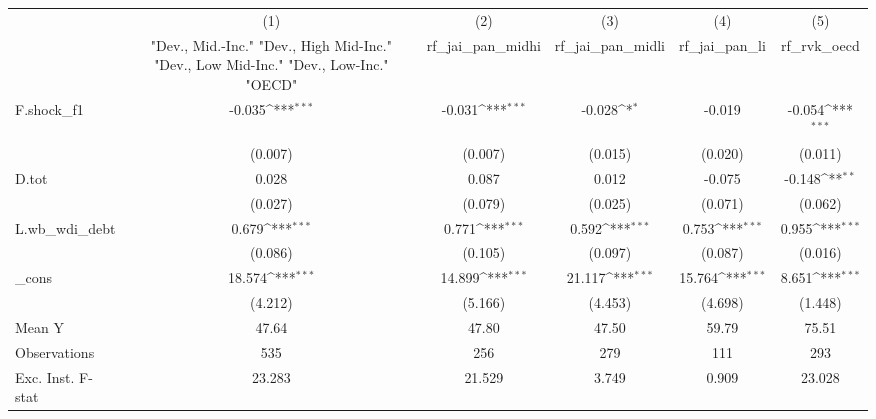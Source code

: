 {
\def\sym#1{\ifmmode^{#1}\else\(^{#1}\)\fi}
\begin{tabular}{l*{5}{c}}
\toprule
            &\multicolumn{1}{c}{(1)}&\multicolumn{1}{c}{(2)}&\multicolumn{1}{c}{(3)}&\multicolumn{1}{c}{(4)}&\multicolumn{1}{c}{(5)}\\
            &\multicolumn{1}{c}{ "Dev., Mid.-Inc." "Dev., High Mid-Inc." "Dev., Low Mid-Inc." "Dev., Low-Inc." "OECD" }&\multicolumn{1}{c}{rf\_jai\_pan\_midhi}&\multicolumn{1}{c}{rf\_jai\_pan\_midli}&\multicolumn{1}{c}{rf\_jai\_pan\_li}&\multicolumn{1}{c}{rf\_rvk\_oecd}\\
\midrule
F.shock\_f1  &      -0.035\sym{***}&      -0.031\sym{***}&      -0.028\sym{*}  &      -0.019         &      -0.054\sym{***}\\
            &     (0.007)         &     (0.007)         &     (0.015)         &     (0.020)         &     (0.011)         \\
\addlinespace
D.tot       &       0.028         &       0.087         &       0.012         &      -0.075         &      -0.148\sym{**} \\
            &     (0.027)         &     (0.079)         &     (0.025)         &     (0.071)         &     (0.062)         \\
\addlinespace
L.wb\_wdi\_debt&       0.679\sym{***}&       0.771\sym{***}&       0.592\sym{***}&       0.753\sym{***}&       0.955\sym{***}\\
            &     (0.086)         &     (0.105)         &     (0.097)         &     (0.087)         &     (0.016)         \\
\addlinespace
\_cons      &      18.574\sym{***}&      14.899\sym{***}&      21.117\sym{***}&      15.764\sym{***}&       8.651\sym{***}\\
            &     (4.212)         &     (5.166)         &     (4.453)         &     (4.698)         &     (1.448)         \\
\midrule
Mean Y      &       47.64         &       47.80         &       47.50         &       59.79         &       75.51         \\
Observations&         535         &         256         &         279         &         111         &         293         \\
Exc. Inst. F-stat&      23.283         &      21.529         &       3.749         &       0.909         &      23.028         \\
\bottomrule
\end{tabular}
}
